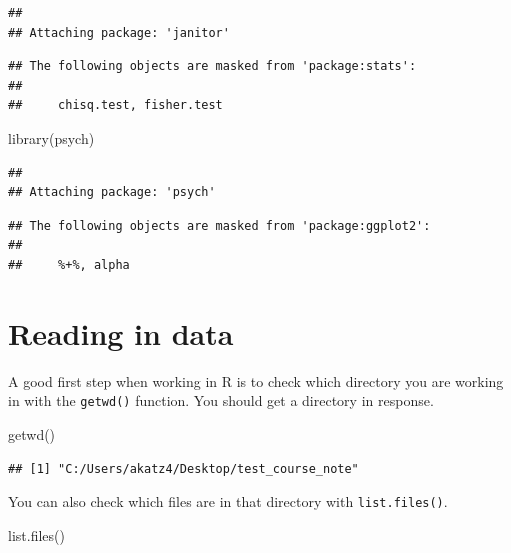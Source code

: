 \documentclass[
]{book}
\newenvironment{Shaded}{\begin{snugshade}}{\end{snugshade}}
\newcommand{\FunctionTok}[1]{\textcolor[rgb]{0.00,0.00,0.00}{#1}}
\newcommand{\NormalTok}[1]{#1}
\begin{document}
\begin{verbatim}
## 
## Attaching package: 'janitor'
\end{verbatim}

\begin{verbatim}
## The following objects are masked from 'package:stats':
## 
##     chisq.test, fisher.test
\end{verbatim}

\begin{Shaded}
\begin{Highlighting}[]
\FunctionTok{library}\NormalTok{(psych)}
\end{Highlighting}
\end{Shaded}

\begin{verbatim}
## 
## Attaching package: 'psych'
\end{verbatim}

\begin{verbatim}
## The following objects are masked from 'package:ggplot2':
## 
##     %+%, alpha
\end{verbatim}

\hypertarget{reading-in-data}{%
\section{Reading in data}\label{reading-in-data}}

A good first step when working in R is to check which directory you are working in with the \texttt{getwd()} function. You should get a directory in response.

\begin{Shaded}
\begin{Highlighting}[]
\FunctionTok{getwd}\NormalTok{()}
\end{Highlighting}
\end{Shaded}

\begin{verbatim}
## [1] "C:/Users/akatz4/Desktop/test_course_note"
\end{verbatim}

You can also check which files are in that directory with \texttt{list.files()}.

\begin{Shaded}
\begin{Highlighting}[]
\FunctionTok{list.files}\NormalTok{()}
\end{Highlighting}
\end{Shaded}
\end{document}
